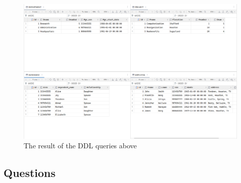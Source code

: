 \documentclass[12pt,titlepage]{article}
\begin{document}
\begin{enumerate}[label=\Alph*.]
{        \begin{figure}[h]
            \centering
            \includegraphics[width=\textwidth]{./images/db_tables.png}
            \caption{The result of the DDL queries above}
        \end{figure}
    }
\end{enumerate}

\subsection{Questions}
\end{document}
